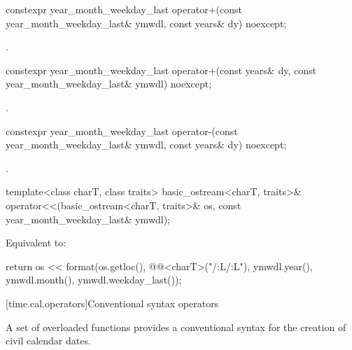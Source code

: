 %
\begin{itemdecl}
constexpr year_month_weekday_last
  operator+(const year_month_weekday_last& ymwdl, const years& dy) noexcept;
\end{itemdecl}

\begin{itemdescr}
\pnum
\returns
{}.
\end{itemdescr}

%
\begin{itemdecl}
constexpr year_month_weekday_last
  operator+(const years& dy, const year_month_weekday_last& ymwdl) noexcept;
\end{itemdecl}

\begin{itemdescr}
\pnum
\returns
{}.
\end{itemdescr}

%
\begin{itemdecl}
constexpr year_month_weekday_last
  operator-(const year_month_weekday_last& ymwdl, const years& dy) noexcept;
\end{itemdecl}

\begin{itemdescr}
\pnum
\returns
{}.
\end{itemdescr}

%
\begin{itemdecl}
template<class charT, class traits>
  basic_ostream<charT, traits>&
    operator<<(basic_ostream<charT, traits>& os, const year_month_weekday_last& ymwdl);
\end{itemdecl}

\begin{itemdescr}
\pnum
\effects
Equivalent to:
\begin{codeblock}
return os << format(os.getloc(), @@<charT>("{}/{:L}/{:L}"),
                    ymwdl.year(), ymwdl.month(), ymwdl.weekday_last());
\end{codeblock}
\end{itemdescr}

[time.cal.operators]{Conventional syntax operators}

\pnum
A set of overloaded  functions provides
a conventional syntax for the creation of civil calendar dates.

